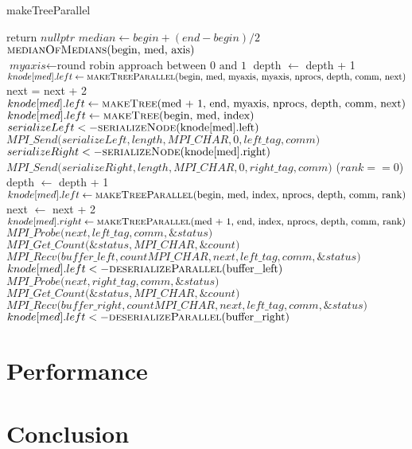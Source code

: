 \documentclass[11pt,a4paper]{article}
\begin{document}
\begin{algorithm}[H]
\caption{makeTreeParallel}
\begin{algorithmic}[1]
\State return $\textit{nullptr}$
\EndIf
\State $\textit{median} \gets begin + (end - begin) / 2$
\State $\Call{medianOfMedians}{$begin, med, axis$}$
\State $\textit{myaxis} \gets \text{round robin approach between 0 and 1}$
\State depth $\gets$ depth + 1
\State $knode[med].left \gets \Call{makeTreeParallel}{$begin, med, myaxis, myaxis, nprocs, depth, comm, next$}$
\State next = next + 2
\State $knode[med].left \gets \Call{makeTree}{$med + 1, end, myaxis, nprocs, depth, comm, next$}$
\Else
{}
\State $knode[med].left \gets \Call{makeTree}{$begin, med, index$}$
\color{red}
\State $serializeLeft <- \Call{serializeNode}{$knode[med].left$}$
\color{black}
\color{blue}
\State $\textit{MPI\_Send({$serializeLeft, length, MPI\_CHAR, 0, left\_tag, comm$}})$
\color{black}
\color{red}
\State $serializeRight <- \Call{serializeNode}{$knode[med].right$}$
\color{black}
\color{blue}
\State $\textit{MPI\_Send({$serializeRight, length, MPI\_CHAR, 0, right\_tag, comm$}})$
\color{black}
\EndIf
\EndIf
\EndIf
\If($rank == 0$)
\State depth $\gets$ depth + 1
\State $knode[med].left \gets \Call{makeTreeParallel}{$begin, med, index, nprocs, depth, comm, rank$}$
\State next $\gets$ next + 2
\State $knode[med].right \gets \Call{makeTreeParallel}{$med + 1, end, index, nprocs, depth, comm, rank$}$
\Else 
\color{blue}
\State $\textit{MPI\_Probe({$next, left\_tag, comm, \&status$}})$
\State $\textit{MPI\_Get\_Count({$\&status, MPI\_CHAR, \&count$}})$
\State $\textit{MPI\_Recv({$buffer\_left, count MPI\_CHAR, next, left\_tag, comm, \&status$}})$
\color{red}
\State $knode[med].left <- \Call{deserializeParallel}{$buffer\_left$}$
\color{black}
\color{blue}
\State $\textit{MPI\_Probe({$next, right\_tag, comm, \&status$}})$
\State $\textit{MPI\_Get\_Count({$\&status, MPI\_CHAR, \&count$}})$
\State $\textit{MPI\_Recv({$buffer\_right, count MPI\_CHAR, next, left\_tag, comm, \&status$}})$
\color{red}
\State $knode[med].left <- \Call{deserializeParallel}{$buffer\_right$}$
\color{black}
\EndIf
\EndIf
\State \Return {}
\EndFunction
\end{algorithmic}
\end{algorithm}
\section{Performance}
\section{Conclusion}
\end{document}
